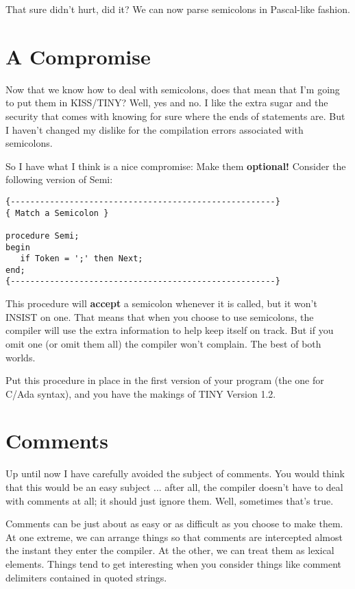 That  sure  didn't  hurt, did it?  We can now parse semicolons in Pascal-like fashion.

\section{A Compromise}

Now that we know how to deal with semicolons, does that mean that I'm going to put them in KISS/TINY?  Well, yes and  no. I like the extra sugar and the security that comes with knowing for sure where the  ends  of  statements  are. But I haven't changed my dislike for the compilation errors associated with semicolons.

So I have what I think is a nice compromise: Make them {\bfseries optional!}
Consider the following version of Semi:

\begin{verbatim}
{------------------------------------------------------}
{ Match a Semicolon }

procedure Semi;
begin
   if Token = ';' then Next;
end;
{------------------------------------------------------}
\end{verbatim}

This procedure will {\bfseries accept} a semicolon whenever it is called, but it won't INSIST on one. That means that when  you  choose to use semicolons, the compiler  will  use the extra information to help keep itself on track. But if you omit one (or omit them all) the compiler won't complain. The best of both worlds.

Put this procedure in place in the first version of  your program (the  one for C/Ada syntax), and you have  the  makings  of  TINY Version 1.2.

\section{Comments}

Up  until  now  I have carefully avoided the subject of comments. You would think that this would be an easy subject ... after all, the compiler doesn't have to deal with comments at all; it should just ignore them. Well, sometimes that's true.

Comments can be just about as easy or as difficult as  you choose to make them. At  one  extreme, we can arrange things so that comments  are  intercepted  almost  the  instant  they  enter the compiler. At the  other, we can treat them as lexical elements. Things  tend to get interesting when  you  consider  things  like comment delimiters contained in quoted strings.

